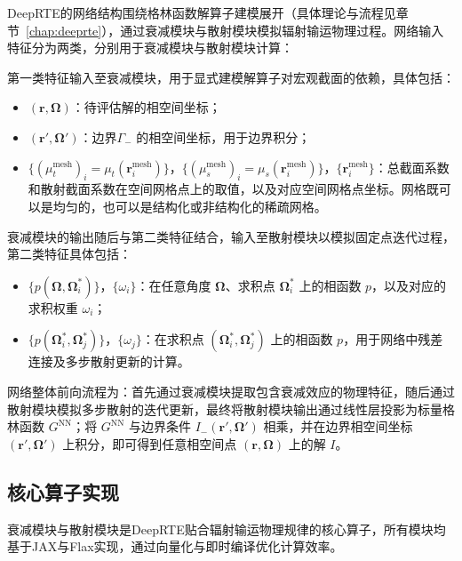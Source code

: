 DeepRTE的网络结构围绕格林函数解算子建模展开（具体理论与流程见章节~\ref{chap:deeprte}），通过衰减模块与散射模块模拟辐射输运物理过程。网络输入特征分为两类，分别用于衰减模块与散射模块计算：

第一类特征输入至衰减模块，用于显式建模解算子对宏观截面的依赖，具体包括：
\begin{itemize}
    \item $(\boldsymbol{r},\boldsymbol{\Omega})$：待评估解的相空间坐标；
    \item $(\boldsymbol{r}',\boldsymbol{\Omega}')$：边界$\Gamma_-$ 的相空间坐标，用于边界积分；
    \item $\{{(\mu_t^{\text{mesh}})}_i=\mu_t(\boldsymbol{r}^{\text{mesh}}_i)\}$，$\{{(\mu_s^{\text{mesh}})}_i=\mu_s(\boldsymbol{r}^{\text{mesh}}_i)\}$，$\{\boldsymbol{r}^{\text{mesh}}_i\}$：总截面系数和散射截面系数在空间网格点上的取值，以及对应空间网格点坐标。网格既可以是均匀的，也可以是结构化或非结构化的稀疏网格。
\end{itemize}

衰减模块的输出随后与第二类特征结合，输入至散射模块以模拟固定点迭代过程，第二类特征具体包括：
\begin{itemize}
    \item  $\{p(\boldsymbol{\Omega}, \boldsymbol{\Omega}^*_i)\}$，$\{\omega_i\}$：在任意角度 $\boldsymbol{\Omega}$、求积点 $\boldsymbol{\Omega}^*_i$ 上的相函数 $p$，以及对应的求积权重 $\omega_i$；
    \item  $\{p(\boldsymbol{\Omega}^*_i, \boldsymbol{\Omega}^*_j)\}$，$\{\omega_j\}$：在求积点 $(\boldsymbol{\Omega}^*_i, \boldsymbol{\Omega}^*_j)$ 上的相函数 $p$，用于网络中残差连接及多步散射更新的计算。
\end{itemize}

网络整体前向流程为：首先通过衰减模块提取包含衰减效应的物理特征，随后通过散射模块模拟多步散射的迭代更新，最终将散射模块输出通过线性层投影为标量格林函数 $G^{\text{NN}}$；将 $G^{\text{NN}}$ 与边界条件 $I_{-}(\boldsymbol{r}',\boldsymbol{\Omega}')$ 相乘，并在边界相空间坐标 $(\boldsymbol{r}',\boldsymbol{\Omega}')$ 上积分，即可得到任意相空间点 $(\boldsymbol{r},\boldsymbol{\Omega})$ 上的解 $I$。

\subsection{核心算子实现}

衰减模块与散射模块是DeepRTE贴合辐射输运物理规律的核心算子，所有模块均基于JAX与Flax实现，通过向量化与即时编译优化计算效率。

